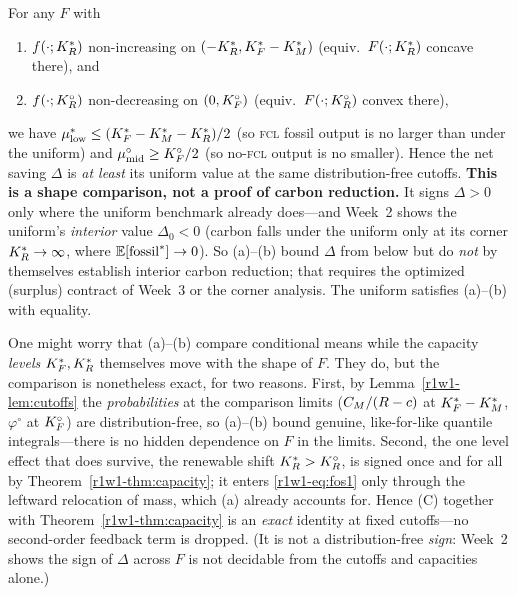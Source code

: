 \begin{corollary}\label{r1w1-cor:suff}
For any $F$ with
\begin{enumerate}[label=(\alph*),leftmargin=2.4em]
  \item $f(\cdot;K_R^{*})$ non-increasing on $(-K_R^{*},K_F^{*}-K_M^{*})$ \;(equiv.\ $F(\cdot;K_R^{*})$ concave there), and
  \item $f(\cdot;K_R^{\circ})$ non-decreasing on $(0,K_F^{\circ})$ \;(equiv.\ $F(\cdot;K_R^{\circ})$ convex there),
\end{enumerate}
we have $\mu^{*}_{\mathrm{low}}\le(K_F^{*}-K_M^{*}-K_R^{*})/2$ (so \textsc{fcl} fossil output is no
larger than under the uniform) and $\mu^{\circ}_{\mathrm{mid}}\ge K_F^{\circ}/2$ (so no-\textsc{fcl}
output is no smaller). Hence the net saving $\Delta$ is \emph{at least} its uniform value at
the same distribution-free cutoffs. \textbf{This is a shape comparison, not a proof of
carbon reduction.} It signs $\Delta>0$ only where the uniform benchmark already does---and
Week~2 shows the uniform's \emph{interior} value $\Delta_0<0$ (carbon falls under the
uniform only at its corner $K_R^{*}\to\infty$, where $\mathbb{E}[\text{fossil}^{*}]\to0$). So (a)--(b)
bound $\Delta$ from below but do \emph{not} by themselves establish interior carbon
reduction; that requires the optimized (surplus) contract of Week~3 or the corner analysis.
The uniform satisfies (a)--(b) with equality.
\end{corollary}

\begin{remark}\label{r1w1-rem:feedback}
One might worry that (a)--(b) compare conditional means while the capacity
\emph{levels} $K_F^{*},K_R^{*}$ themselves move with the shape of $F$. They do, but the
comparison is nonetheless exact, for two reasons. First, by
Lemma~\ref{r1w1-lem:cutoffs} the \emph{probabilities} at the comparison limits
($C_M/(R-c)$ at $K_F^{*}-K_M^{*}$, $\varphi^{\circ}$ at $K_F^{\circ}$) are distribution-free,
so (a)--(b) bound genuine, like-for-like quantile integrals---there is no hidden
dependence on $F$ in the limits. Second, the one level effect that does survive,
the renewable shift $K_R^{*}>K_R^{\circ}$, is signed once and for all by
Theorem~\ref{r1w1-thm:capacity}; it enters \eqref{r1w1-eq:fos1} only through the leftward
relocation of mass, which (a) already accounts for. Hence (C) together with
Theorem~\ref{r1w1-thm:capacity} is an \emph{exact} identity at fixed cutoffs---no
second-order feedback term is dropped. (It is not a distribution-free \emph{sign}: Week~2
shows the sign of $\Delta$ across $F$ is not decidable from the cutoffs and capacities
alone.)
\end{remark}

